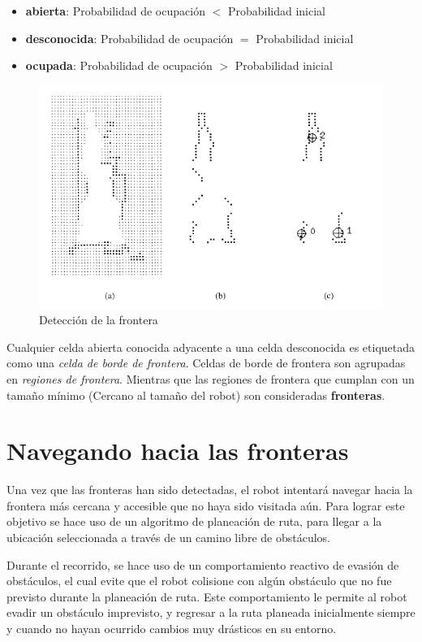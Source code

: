 \documentclass[12pt]{article}
\begin{document}
\begin{itemize}
	\item \textbf{abierta}: Probabilidad de ocupación $<$ Probabilidad inicial
	\item \textbf{desconocida}: Probabilidad de ocupación $=$ Probabilidad inicial
	\item \textbf{ocupada}: Probabilidad de ocupación $>$ Probabilidad inicial
\end{itemize}

\begin{figure}[!h]
	\includegraphics[scale=1]{images/frontier_detection.PNG}
	\caption{Detección de la frontera}
	\label{fig:frontier1}
\end{figure}

Cualquier celda abierta conocida adyacente a una celda desconocida es etiquetada como una \emph{celda de borde de frontera}. Celdas de borde de frontera son agrupadas en \emph{regiones de frontera}. Mientras que las regiones de frontera que cumplan con un tamaño mínimo (Cercano al tamaño del robot) son consideradas \textbf{fronteras}.

\section{Navegando hacia las fronteras}

Una vez que las fronteras han sido detectadas, el robot intentará navegar hacia la frontera más cercana y accesible que no haya sido visitada aún. Para lograr este objetivo se hace uso de un algoritmo de planeación de ruta, para llegar a la ubicación seleccionada a través de un camino libre de obstáculos.

Durante el recorrido, se hace uso de un comportamiento reactivo de evasión de obstáculos, el cual evite que el robot colisione con algún obstáculo que no fue previsto durante la planeación de ruta. Este comportamiento le permite al robot evadir un obstáculo imprevisto, y regresar a la ruta planeada inicialmente siempre y cuando no hayan ocurrido cambios muy drásticos en su entorno.
\end{document}
